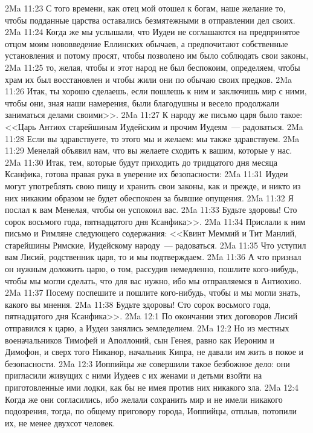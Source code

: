 \vs 2Ma 11:23 С того времени, как отец мой отошел к богам, наше желание то, чтобы подданные царства оставались безмятежными в отправлении дел своих.
\vs 2Ma 11:24 Когда же мы услышали, что Иудеи не соглашаются на предпринятое отцом моим нововведение Еллинских обычаев, а предпочитают собственные установления и потому просят, чтобы позволено им было соблюдать свои законы,
\vs 2Ma 11:25 то, желая, чтобы и этот народ не был беспокоим, определяем, чтобы храм их был восстановлен и чтобы жили они по обычаю своих предков.
\vs 2Ma 11:26 Итак, ты хорошо сделаешь, если пошлешь к ним и заключишь мир с ними, чтобы они, зная наши намерения, были благодушны и весело продолжали заниматься делами своими>>.
\vs 2Ma 11:27 К народу же письмо царя было такое: <<Царь Антиох старейшинам Иудейским и прочим Иудеям~--- радоваться.
\vs 2Ma 11:28 Если вы здравствуете, то этого мы и желаем: мы также здравствуем.
\vs 2Ma 11:29 Менелай объявил нам, что вы желаете сходить к вашим, которые у нас.
\vs 2Ma 11:30 Итак, тем, которые будут приходить до тридцатого дня месяца Ксанфика, готова правая рука в уверение их безопасности:
\vs 2Ma 11:31 Иудеи могут употреблять свою пищу и хранить свои законы, как и прежде, и никто из них никаким образом не будет обеспокоен за бывшие опущения.
\vs 2Ma 11:32 Я послал к вам Менелая, чтобы он успокоил вас.
\vs 2Ma 11:33 Будьте здоровы! Сто сорок восьмого года, пятнадцатого дня Ксанфика>>.
\vs 2Ma 11:34 Прислали к ним письмо и Римляне следующего содержания: <<Квинт Меммий и Тит Манлий, старейшины Римские, Иудейскому народу~--- радоваться.
\vs 2Ma 11:35 Что уступил вам Лисий, родственник царя, то и мы подтверждаем.
\vs 2Ma 11:36 А что признал он нужным доложить царю, о том, рассудив немедленно, пошлите кого-нибудь, чтобы мы могли сделать, что для вас нужно, ибо мы отправляемся в Антиохию.
\vs 2Ma 11:37 Посему поспешите и пошлите кого-нибудь, чтобы и мы могли знать, какого вы мнения.
\vs 2Ma 11:38 Будьте здоровы! Сто сорок восьмого года, пятнадцатого дня Ксанфика>>.
\vs 2Ma 12:1 По окончании этих договоров Лисий отправился к царю, а Иудеи занялись земледелием.
\vs 2Ma 12:2 Но из местных военачальников Тимофей и Аполлоний, сын Генея, равно как Иероним и Димофон, и сверх того Никанор, начальник Кипра, не давали им жить в покое и безопасности.
\vs 2Ma 12:3 Иоппийцы же совершили такое безбожное дело: они пригласили живущих с ними Иудеев с их женами и детьми взойти на приготовленные ими лодки, как бы не имея против них никакого зла.
\vs 2Ma 12:4 Когда же они согласились, ибо желали сохранить мир и не имели никакого подозрения, тогда, по общему приговору города, Иоппийцы, отплыв, потопили их, не менее двухсот человек.
